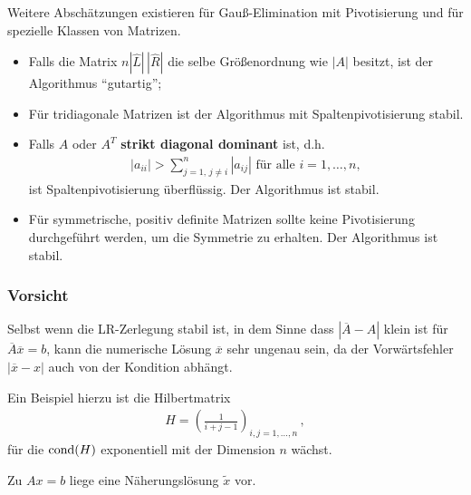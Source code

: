 Weitere Abschätzungen existieren für Gauß-Elimination mit 
Pivotisierung und für spezielle Klassen von Matrizen.

\label{III.3.13}
\begin{itemize}
\item Falls die Matrix $n | \hat{ L} | \,  |\hat{ R}|$ die
  selbe Größenordnung wie $| A|$ besitzt, ist der
  Algorithmus \enquote{gutartig};
\item Für tridiagonale Matrizen  ist der Algorithmus mit
  Spaltenpivotisierung stabil.
\item Falls $ A$ oder $ A^T$  \textbf{strikt diagonal
    dominant} ist, d.h. 
  \begin{gather*}
    | a_{ii} | > \sum\limits_{j=1 ,\, j \not = i}^{n} | a_{ij}| 
    \mbox{ für alle } i = 1, \dotsc, n,
  \end{gather*}
  ist Spaltenpivotisierung überflüssig. Der Algorithmus ist stabil.
\item Für symmetrische, positiv definite Matrizen sollte keine Pivotisierung
  durchgeführt werden, um die Symmetrie zu erhalten.
  Der Algorithmus ist stabil.
\end{itemize}

\subsubsection{Vorsicht}
Selbst wenn die LR-Zerlegung stabil ist, in dem Sinne dass
$| \overline{ A} - A|$ klein ist für
$ \overline{ A}\overline{ x}  =  b $, 
kann die numerische Lösung $\overline{ x}$ sehr
ungenau sein, da der Vorwärtsfehler $|\overline{x}-{x}|$ auch von der
Kondition abhängt.

Ein Beispiel hierzu ist die Hilbertmatrix
\begin{gather*}
  H  =  \left( \frac{1}{i + j -1 } \right)_{i,j= 1,\dotsc, n}\, ,
\end{gather*}
für die $\operatorname{cond} ( H)$ exponentiell mit der Dimension $n$ wächst.


Zu $Ax=b$ liege eine Näherungslösung $\widetilde{x}$ vor.


